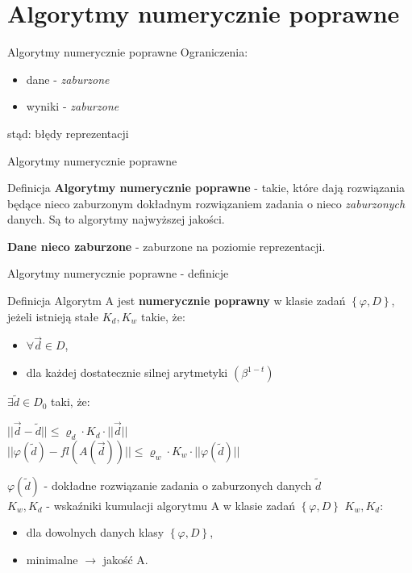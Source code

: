 $  $\section{Algorytmy numerycznie poprawne}
\begin{frame}{Algorytmy numerycznie poprawne}
	Ograniczenia:
    \begin{itemize}
    	\item dane - {\it zaburzone}
    	\item wyniki - {\it zaburzone}
    \end{itemize}
    stąd: błędy reprezentacji
\end{frame}
\begin{frame}{Algorytmy numerycznie poprawne}
	\begin{block}{Definicja}
		{\bf Algorytmy numerycznie poprawne} - takie, które dają rozwiązania będące nieco zaburzonym dokładnym rozwiązaniem zadania o nieco {\it zaburzonych} danych. Są to algorytmy najwyższej jakości.
        
        {\bf Dane nieco zaburzone} - zaburzone na poziomie reprezentacji.
	\end{block}
\end{frame}
\begin{frame}{Algorytmy numerycznie poprawne - definicje}
	\begin{block}{Definicja}
    	Algorytm A jest {\bf numerycznie poprawny} w klasie zadań $\left\{ \varphi, D \right\}$, jeżeli istnieją stałe $K_d, K_w$ takie, że:
        \begin{itemize}
        	\item $\forall \vec{d} \in D$,
            \item dla każdej dostatecznie silnej arytmetyki $\left( \beta^{1-t} \right)$
        \end{itemize}
        $\exists \tilde{d} \in D_0$ taki, że:
        
        {\centering
        	$|| \vec{d} - \tilde{d} || \le \varrho_d \cdot K_d \cdot || \vec{d} ||$ \\ \vspace{.1cm}
            $|| \varphi(\tilde{d}) - fl(A(\vec{d})) || \le \varrho_w \cdot K_w \cdot || \varphi(\tilde{d}) ||$ \\}

        $\varphi(\tilde{d})$ - dokładne rozwiązanie zadania o zaburzonych danych $\tilde{d}$ \\
        $K_w, K_d$ - wskaźniki kumulacji algorytmu A w klasie zadań $\left\{\varphi, D\right\}$
        $K_w, K_d$:
        \begin{itemize}
        	\item dla dowolnych danych klasy $\left\{ \varphi, D \right\}$,
            \item minimalne $\rightarrow$ jakość A.
        \end{itemize}
	\end{block}
\end{frame}

